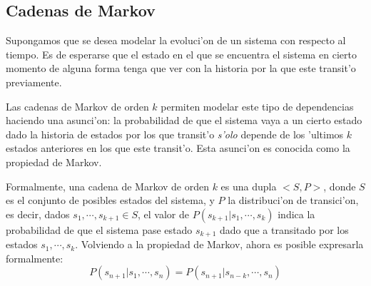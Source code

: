 %
%
%
%
%

\subsection{Cadenas de Markov}
Supongamos que se desea modelar la evoluci'on de un sistema con respecto al tiempo. Es de esperarse que 
el estado en el que se encuentra el sistema en cierto momento de alguna forma tenga que ver con la historia por la que este transit'o
previamente. 

Las cadenas de Markov de orden $k$ permiten modelar este tipo de dependencias haciendo una asunci'on: la probabilidad de que el sistema vaya a un cierto estado
dado la historia de estados por los que transit'o \emph{s'olo} depende de los 'ultimos $k$ estados anteriores en los que este transit'o. 
Esta asunci'on es conocida como la propiedad de Markov. 

Formalmente, una cadena de Markov de orden $k$ es una dupla $<S,P>$, donde $S$ es el conjunto de posibles estados del sistema, y $P$ la 
distribuci'on de transici'on, es decir, dados $s_1, \cdots, s_{k+1} \in S$, el valor de $P(s_{k+1} | s_1, \cdots, s_k)$ indica la probabilidad
de que el sistema pase estado $s_{k+1}$ dado que a transitado por los estados $s_1, \cdots, s_k$. 
Volviendo a la propiedad de Markov, ahora es posible expresarla formalmente: $$P(s_{n+1}|s_1,\cdots,s_n) = P(s_{n+1} | s_{n-k}, \cdots, s_n)$$

